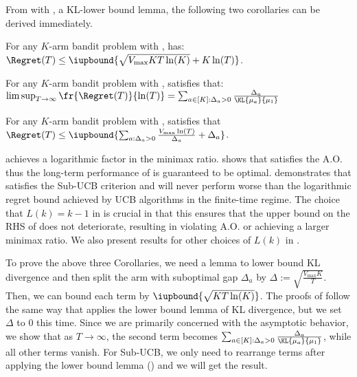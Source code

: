 From  with , a KL-lower bound lemma, the following two corollaries can be derived immediately.
\begin{corollary}\label{corol:exp-kl-ms-mo}
    For any $K$-arm bandit problem with , \expklms has:
    $
        \Regret(T) \leq \iupbound{  
        \sqrt{ V_{\max} KT\ln(K)} + K \ln(T)}
    $.
\end{corollary}
\begin{corollary} \label{corol:exp-kl-ms-ao}
    For any $K$-arm bandit problem with , \expklms satisfies that:
    $
        \limsup_{T \rightarrow \infty} \fr{ \Regret(T) }{\ln(T)}
        =
        \sum_{a\in[K]:\Delta_a>0}
        \frac{\Delta_a}{\KL{\mu_a}{\mu_1}}
    $
\end{corollary}
\begin{corollary} \label{corol:exp-kl-ms-sub-ucb}
    For any $K$-arm bandit problem with , \expklms satisfies that  $\Regret(T) \leq \iupbound{\sum_{a: \Delta_a > 0} \frac{V_{\max}\ln(T)}{\Delta_a} + \Delta_a}$.
\end{corollary}

 achieves a logarithmic factor in the minimax ratio.
 shows that \expklms satisfies the A.O. thus the long-term performance of \expklms is guaranteed to be optimal.
 demonstrates that \expklms satisfies the Sub-UCB criterion and will never perform worse than the logarithmic regret bound achieved by UCB algorithms in the finite-time regime.
The choice that $L(k) = k-1$ in \expklms is crucial in that this ensures that the upper bound on the RHS of  does not deteriorate, resulting in violating A.O. or achieving a larger minimax ratio.
We also present results for other choices of $L(k)$ in .

To prove the above three Corollaries, we need a lemma to lower bound KL divergence and then split the arm with suboptimal gap $\Delta_a$ by $\Delta:= \sqrt{\tfrac{V_{\max}K}{T}}$.
Then, we can bound each term by $\iupbound{\sqrt{KT \ln(K)}}$. 
The proofs of  follow the same way that applies the lower bound lemma of KL divergence, but we set $\Delta$ to $0$ this time. 
Since we are primarily concerned with the asymptotic behavior, we show that as $T \to \infty$, the second term becomes $\sum_{a\in[K]: \Delta_a > 0} \frac{\Delta_a}{\KL{\mu_a}{\mu_1}}$, while all other terms vanish.
For Sub-UCB, we only need to rearrange terms after applying the lower bound lemma () and we will get the result.

